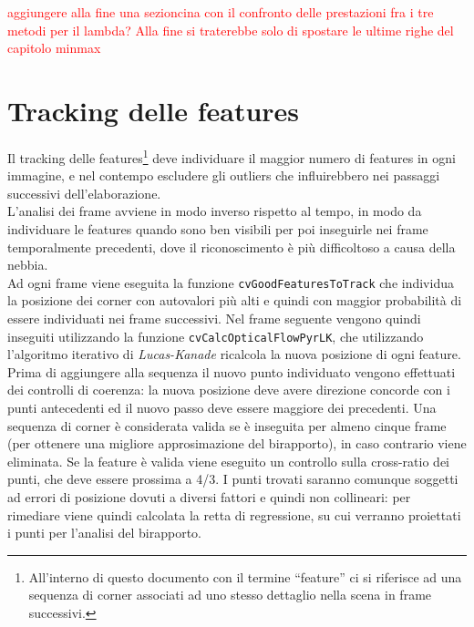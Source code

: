 \documentclass[12pt]{report}
\begin{document}
\noindent \textcolor{red}{aggiungere alla fine una sezioncina con il confronto delle prestazioni fra i tre metodi per il lambda? Alla fine si traterebbe solo di spostare le ultime righe del capitolo minmax}


\section{Tracking delle features}
\label{sect:track}

\noindent Il tracking delle features\footnote{All'interno di questo documento con il termine ``feature'' ci si riferisce ad una sequenza di corner associati ad uno stesso dettaglio nella scena in frame successivi.} deve individuare il maggior numero di features in ogni immagine, e nel contempo escludere gli outliers che influirebbero nei passaggi successivi dell'elaborazione.\\
L'analisi dei frame avviene in modo inverso rispetto al tempo, in modo da individuare le features quando sono ben visibili per poi inseguirle nei frame temporalmente precedenti, dove il riconoscimento \`e pi\`u difficoltoso a causa della nebbia.\\

\noindent Ad ogni frame viene eseguita la funzione \verb|cvGoodFeaturesToTrack| che individua la posizione dei corner con autovalori pi\`u alti e quindi con maggior probabilit\`a di essere individuati nei frame successivi. Nel frame seguente vengono quindi inseguiti utilizzando la funzione \verb|cvCalcOpticalFlowPyrLK|, che utilizzando l'algoritmo iterativo di \emph{Lucas-Kanade} ricalcola la nuova posizione di ogni feature.\\

\noindent Prima di aggiungere alla sequenza il nuovo punto individuato vengono effettuati dei controlli di coerenza: la nuova posizione deve avere direzione concorde con i punti antecedenti ed il nuovo passo deve essere maggiore dei precedenti. Una sequenza di corner \`e considerata valida se \`e inseguita per almeno cinque frame (per ottenere una migliore approsimazione del birapporto), in caso contrario viene eliminata. Se la feature \`e valida viene eseguito un controllo sulla cross-ratio dei punti, che deve essere prossima a 4/3. I punti trovati saranno comunque soggetti ad errori di posizione dovuti a diversi fattori e quindi non collineari: per rimediare viene quindi calcolata la retta di regressione, su cui verranno proiettati i punti per l'analisi del birapporto.\\
\end{document}
